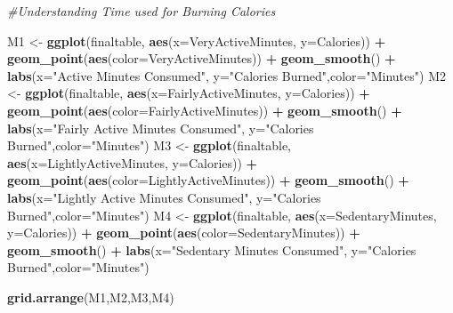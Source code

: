 \documentclass[
]{article}
\newenvironment{Shaded}{\begin{snugshade}}{\end{snugshade}}
\newcommand{\AttributeTok}[1]{\textcolor[rgb]{0.13,0.29,0.53}{#1}}
\newcommand{\CommentTok}[1]{\textcolor[rgb]{0.56,0.35,0.01}{\textit{#1}}}
\newcommand{\FunctionTok}[1]{\textcolor[rgb]{0.13,0.29,0.53}{\textbf{#1}}}
\newcommand{\NormalTok}[1]{#1}
\newcommand{\OtherTok}[1]{\textcolor[rgb]{0.56,0.35,0.01}{#1}}
\newcommand{\SpecialCharTok}[1]{\textcolor[rgb]{0.81,0.36,0.00}{\textbf{#1}}}
\newcommand{\StringTok}[1]{\textcolor[rgb]{0.31,0.60,0.02}{#1}}
\begin{document}
\begin{Shaded}
\begin{Highlighting}[]
\CommentTok{\#Understanding Time used for Burning Calories}


\NormalTok{M1 }\OtherTok{\textless{}{-}} \FunctionTok{ggplot}\NormalTok{(finaltable, }\FunctionTok{aes}\NormalTok{(}\AttributeTok{x=}\NormalTok{VeryActiveMinutes, }\AttributeTok{y=}\NormalTok{Calories)) }\SpecialCharTok{+} \FunctionTok{geom\_point}\NormalTok{(}\FunctionTok{aes}\NormalTok{(}\AttributeTok{color=}\NormalTok{VeryActiveMinutes)) }\SpecialCharTok{+} \FunctionTok{geom\_smooth}\NormalTok{() }\SpecialCharTok{+} \FunctionTok{labs}\NormalTok{(}\AttributeTok{x=}\StringTok{"Active Minutes Consumed"}\NormalTok{, }\AttributeTok{y=}\StringTok{"Calories Burned"}\NormalTok{,}\AttributeTok{color=}\StringTok{"Minutes"}\NormalTok{)}
\NormalTok{M2 }\OtherTok{\textless{}{-}} \FunctionTok{ggplot}\NormalTok{(finaltable, }\FunctionTok{aes}\NormalTok{(}\AttributeTok{x=}\NormalTok{FairlyActiveMinutes, }\AttributeTok{y=}\NormalTok{Calories)) }\SpecialCharTok{+} \FunctionTok{geom\_point}\NormalTok{(}\FunctionTok{aes}\NormalTok{(}\AttributeTok{color=}\NormalTok{FairlyActiveMinutes)) }\SpecialCharTok{+} \FunctionTok{geom\_smooth}\NormalTok{() }\SpecialCharTok{+} \FunctionTok{labs}\NormalTok{(}\AttributeTok{x=}\StringTok{"Fairly Active Minutes Consumed"}\NormalTok{, }\AttributeTok{y=}\StringTok{"Calories Burned"}\NormalTok{,}\AttributeTok{color=}\StringTok{"Minutes"}\NormalTok{)}
\NormalTok{M3 }\OtherTok{\textless{}{-}} \FunctionTok{ggplot}\NormalTok{(finaltable, }\FunctionTok{aes}\NormalTok{(}\AttributeTok{x=}\NormalTok{LightlyActiveMinutes, }\AttributeTok{y=}\NormalTok{Calories)) }\SpecialCharTok{+} \FunctionTok{geom\_point}\NormalTok{(}\FunctionTok{aes}\NormalTok{(}\AttributeTok{color=}\NormalTok{LightlyActiveMinutes)) }\SpecialCharTok{+} \FunctionTok{geom\_smooth}\NormalTok{() }\SpecialCharTok{+} \FunctionTok{labs}\NormalTok{(}\AttributeTok{x=}\StringTok{"Lightly Active Minutes Consumed"}\NormalTok{, }\AttributeTok{y=}\StringTok{"Calories Burned"}\NormalTok{,}\AttributeTok{color=}\StringTok{"Minutes"}\NormalTok{)}
\NormalTok{M4 }\OtherTok{\textless{}{-}} \FunctionTok{ggplot}\NormalTok{(finaltable, }\FunctionTok{aes}\NormalTok{(}\AttributeTok{x=}\NormalTok{SedentaryMinutes, }\AttributeTok{y=}\NormalTok{Calories)) }\SpecialCharTok{+} \FunctionTok{geom\_point}\NormalTok{(}\FunctionTok{aes}\NormalTok{(}\AttributeTok{color=}\NormalTok{SedentaryMinutes)) }\SpecialCharTok{+} \FunctionTok{geom\_smooth}\NormalTok{() }\SpecialCharTok{+} \FunctionTok{labs}\NormalTok{(}\AttributeTok{x=}\StringTok{"Sedentary Minutes Consumed"}\NormalTok{, }\AttributeTok{y=}\StringTok{"Calories Burned"}\NormalTok{,}\AttributeTok{color=}\StringTok{"Minutes"}\NormalTok{)}

\FunctionTok{grid.arrange}\NormalTok{(M1,M2,M3,M4)}
\end{Highlighting}
\end{Shaded}
\end{document}
